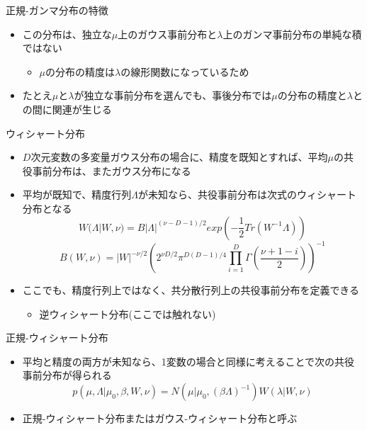 \begin{frame}{正規-ガンマ分布の特徴}
 \begin{itemize}
  \item この分布は、独立な$\mu$上のガウス事前分布と$\lambda$上のガンマ事前分布の単純な積ではない
        \begin{itemize}
         \item $\mu$の分布の精度は$\lambda$の線形関数になっているため
        \end{itemize}
  \item たとえ$\mu$と$\lambda$が独立な事前分布を選んでも、事後分布では$\mu$の分布の精度と$\lambda$との間に関連が生じる
 \end{itemize}
\end{frame}

\begin{frame}{ウィシャート分布}
 \begin{itemize}
  \item $D$次元変数の多変量ガウス分布の場合に、\alert{精度を既知}とすれば、平均$\mu$の共役事前分布は、またガウス分布になる
  \item \alert{平均が既知}で、精度行列$\Lambda$が未知なら、共役事前分布は次式のウィシャート分布となる
        \begin{equation}
         W(\Lambda|W,\nu) = B|\Lambda|^{(\nu-D-1)/2}exp\left(-\frac{1}{2}Tr(W^{-1}\Lambda)\right)
        \end{equation}
        \begin{equation}
         B(W,\nu) = |W|^{-\nu/2}\left(2^{\nu D/2}\pi^{D(D-1)/4}\prod_{i=1}^D\Gamma\left(\frac{\nu+1-i}{2}\right)\right)^{-1}
        \end{equation}
  \item ここでも、精度行列上ではなく、共分散行列上の共役事前分布を定義できる
        \begin{itemize}
         \item 逆ウィシャート分布(ここでは触れない)
        \end{itemize}
 \end{itemize}
\end{frame}

\begin{frame}{正規-ウィシャート分布}
\begin{itemize}
  \item \alert{平均と精度の両方が未知}なら、1変数の場合と同様に考えることで次の共役事前分布が得られる
        \begin{equation}
         p(\mu,\Lambda|\mu_0,\beta,W,\nu) = N(\mu|\mu_0,(\beta\Lambda)^{-1})W(\lambda|W,\nu)
        \end{equation}
         \item \alert{正規-ウィシャート分布}または\alert{ガウス-ウィシャート分布}と呼ぶ
\end{itemize}
\end{frame}

